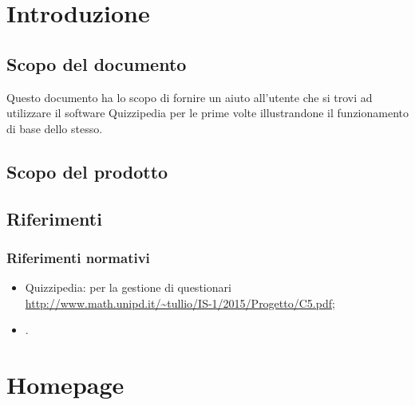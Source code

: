 \documentclass[a4paper, titlepage]{article}
\begin{document}
	
	\pagestyle{fancy}	
	
	\maketitle
	
	
	
	\newpage
	\tableofcontents
	\newpage
	\listoffigures
	\newpage
	\listoftables\label{lastromanpage}
	
	\newpage
	\clearpage	
	\hypersetup{linkcolor=blue}
	
	\section{Introduzione}
	\subsection{Scopo del documento}
	Questo documento ha lo scopo di fornire un aiuto all'utente che si trovi ad utilizzare il software
	Quizzipedia per le prime volte illustrandone il funzionamento di base dello stesso.
	
	\subsection{Scopo del prodotto}
	\SCOPO
	
	\subsection{Riferimenti}	
	\subsubsection{Riferimenti normativi}
	\begin{itemize}
		\item {} Quizzipedia:  per la gestione di questionari \newline \url{http://www.math.unipd.it/~tullio/IS-1/2015/Progetto/C5.pdf};
		\item {} \NdPdoc.
	\end{itemize}
	\newpage
	
	\section{Homepage}
	
\end{document}
